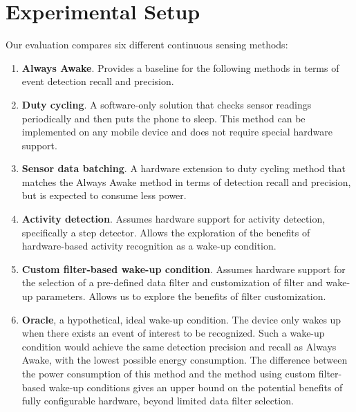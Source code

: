 \section{Experimental Setup}
\label{sec:experimentalSetup}

Our evaluation compares six different continuous sensing methods: 

\begin{enumerate}
\setlength{\itemsep}{-3pt}  

\item \textbf{Always Awake}. Provides a baseline for the following methods in terms of event detection recall and precision.

\item \textbf{Duty cycling}. A software-only solution that checks sensor readings periodically and then puts the phone to sleep. This method can be implemented on any mobile device and does not require special hardware support.

\item \textbf{Sensor data batching}. A hardware extension to duty cycling method that matches the Always Awake method in terms of detection recall and precision, but is expected to consume less power.

\item \textbf{Activity detection}. Assumes hardware support for activity detection, specifically a step detector. Allows the exploration of the benefits of hardware-based activity recognition as a wake-up condition.

\item \textbf{Custom filter-based wake-up condition}. Assumes hardware support for the selection of a pre-defined data filter and customization of filter and wake-up parameters. Allows us to explore the benefits of filter customization.

\item \textbf{Oracle}, a hypothetical, ideal wake-up condition. The device only wakes up when there exists an event of interest to be recognized. Such a wake-up condition would achieve the same detection precision and recall as Always Awake, with the lowest possible energy consumption. The difference between the power consumption of this method and the method using custom filter-based wake-up conditions gives an upper bound on the potential benefits of fully configurable hardware, beyond limited data filter selection.

\end{enumerate}

